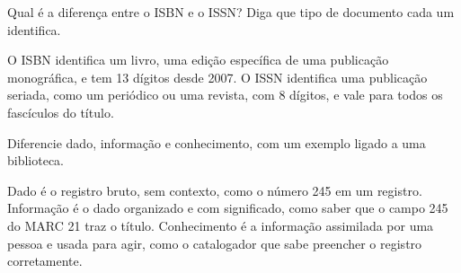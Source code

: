 \documentclass[12pt,a4paper]{exam}
\begin{document}
\begin{questions}
Qual é a diferença entre o ISBN e o ISSN? Diga que tipo de documento cada um identifica.
\begin{solution}
O ISBN identifica um livro, uma edição específica de uma publicação monográfica, e tem 13 dígitos desde 2007. O ISSN identifica uma publicação seriada, como um periódico ou uma revista, com 8 dígitos, e vale para todos os fascículos do título.
\end{solution}
\fillwithlines{2.4cm}

Diferencie dado, informação e conhecimento, com um exemplo ligado a uma biblioteca.
\begin{solution}
Dado é o registro bruto, sem contexto, como o número 245 em um registro. Informação é o dado organizado e com significado, como saber que o campo 245 do MARC 21 traz o título. Conhecimento é a informação assimilada por uma pessoa e usada para agir, como o catalogador que sabe preencher o registro corretamente.
\end{solution}
\fillwithlines{4.4cm}

\end{questions}
\end{document}
